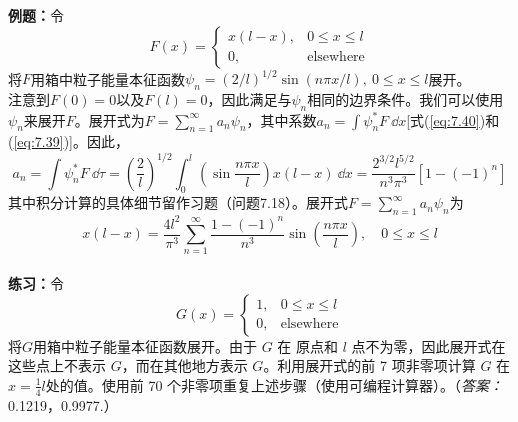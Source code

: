     \begin{examplebox}
        \textbf{例题：}令
        \begin{equation*}
            F\left(x\right) = \begin{cases}
                x\left(l-x\right), & 0 \leq x \leq l \\
                0, & \text{elsewhere}
            \end{cases}
        \end{equation*}
        将$F$用箱中粒子能量本征函数$\psi_n = \left(2/l\right)^{1/2}\sin\left(n\pi x/l\right), \: 0 \leq x \leq l$展开。
        \\
        
        注意到$F\left(0\right) = 0$以及$F\left(l\right) = 0$，因此满足与$\psi_n$相同的边界条件。我们可以使用$\psi_n$来展开$F$。展开式为$F = \sum_{n=1}^{\infty} a_n \psi_n$，其中系数$a_n = \int\psi_n^{\ast} F \:\dd x$[式(\ref{eq:7.40})和(\ref{eq:7.39})]。因此，
        \begin{equation*}
            a_n = \int \psi_{n}^{\ast}F \:\dd \tau = \left(\frac{2}{l}\right)^{1/2} \int_{0}^{l} \left(\sin\frac{n\pi x}{l}\right) x\left(l-x\right) \:\dd x = \frac{2^{3/2}l^{5/2}}{n^3\pi^3}\left[1-\left(-1\right)^n\right]
        \end{equation*}
        其中积分计算的具体细节留作习题（问题7.18）。展开式$F = \sum_{n=1}^{\infty} a_n \psi_n$为
        \begin{equation*}
            x\left(l-x\right) = \frac{4l^2}{\pi^3}\sum_{n=1}^{\infty} \frac{1-\left(-1\right)^n}{n^3}\sin\left(\frac{n\pi x}{l}\right), \quad 0 \leq x \leq l
        \end{equation*}
        \\

        \textbf{练习：}令
        \begin{equation*}
            G\left(x\right) = \begin{cases}
                1, & 0 \leq x \leq l \\
                0, & \text{elsewhere}
            \end{cases}
        \end{equation*}
        将$G$用箱中粒子能量本征函数展开。由于 $G$ 在 原点和 $l$ 点不为零，因此展开式在这些点上不表示 $G$，而在其他地方表示 $G$。利用展开式的前 7 项非零项计算 $G$ 在$x = \frac{1}{4}l$处的值。使用前 70 个非零项重复上述步骤（使用可编程计算器）。（\textit{答案：}0.1219，0.9977.）
    \end{examplebox}

